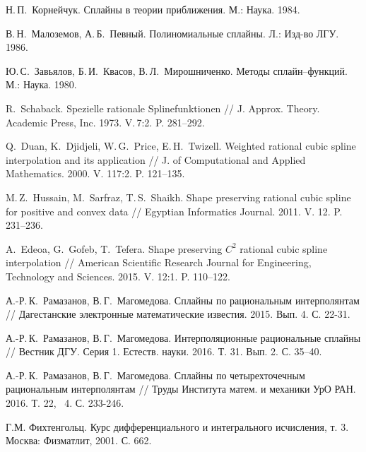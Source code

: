 \begin{thebibliography}{1}
  Н.\,П.~Корнейчук.  Сплайны в теории приближения. М.:  Наука. 1984.


  В.\,Н.~Малоземов, А.\,Б.~Певный. Полиномиальные сплайны. Л.: Изд-во ЛГУ. 1986.

 Ю.\,С.~Завьялов, Б.\,И.~Квасов, В.\,Л.~Мирошниченко.  Методы сплайн--функций.  М.: Наука. 1980.


 R.~Schaback.  Spezielle rationale Splinefunktionen //  J. Approx. Theory. Academic Press, Inc. 1973. V.\,7:2.
P. 281--292.

  Q.~Duan, K.~Djidjeli, W.\,G.~Price, E.\,H.~Twizell.  Weighted rational  cubic spline interpolation
 and its application // J. of Computational  and Applied Mathematics. 2000. V. 117:2. P. 121--135.

  M.\,Z.~Hussain, M.~Sarfraz, T.\,S.~Shaikh.  Shape preserving rational cubic spline for positive
and convex data //  Egyptian Informatics Journal. 2011. V.  12. P. 231--236.

  A.~Edeoa, G.~Gofeb, T.~Tefera.  Shape preserving $C^2$ rational cubic spline interpolation //
 American Scientific Research Journal for Engineering, Technology and Sciences. 2015. V. 12:1. P. 110--122.

 А.-Р.\,К.~Рамазанов, В.\,Г.~Магомедова. Сплайны по рациональным интерполянтам // Дагестанские
электронные математические известия. 2015. Вып. 4. С. 22-31.

 А.-Р.\,К.~Рамазанов, В.\,Г.~Магомедова. Интерполяционные рациональные сплайны // Вестник ДГУ. Серия 1. Естеств. науки. 2016.
Т. 31. Вып. 2. С. 35--40.

 А.-Р.\,К.~Рамазанов, В.\,Г.~Магомедова. Сплайны по четырехточечным рациональным интерполянтам //
Труды Института матем. и механики УрО РАН. 2016. Т. 22, \No\, 4. С. 233-246.

Г.М. Фихтенгольц. Курс дифференциального и интегрального исчисления, т. 3. Москва: Физматлит, 2001. С. 662.

\end{thebibliography}
